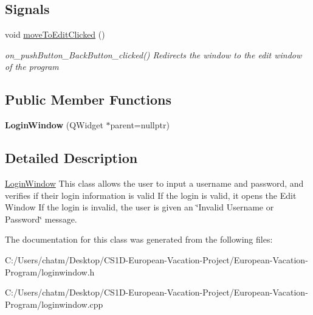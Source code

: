 \subsection*{Signals}
\begin{DoxyCompactItemize}
\item 
\mbox{\label{class_login_window_a0ed797ae07a4afea038499d6929047a1}} 
void \mbox{\hyperlink{class_login_window_a0ed797ae07a4afea038499d6929047a1}{move\+To\+Edit\+Clicked}} ()
\begin{DoxyCompactList}\small\item\em on\+\_\+push\+Button\+\_\+\+Back\+Button\+\_\+clicked() Redirects the window to the edit window of the program \end{DoxyCompactList}\end{DoxyCompactItemize}
\subsection*{Public Member Functions}
\begin{DoxyCompactItemize}
\item 
\mbox{\label{class_login_window_aa4c04d26b299de00156bbf3c32b2a082}} 
{\bfseries Login\+Window} (Q\+Widget $\ast$parent=nullptr)
\end{DoxyCompactItemize}


\subsection{Detailed Description}
\mbox{\hyperlink{class_login_window}{Login\+Window}} This class allows the user to input a username and password, and verifies if their login information is valid If the login is valid, it opens the Edit Window If the login is invalid, the user is given an \char`\"{}\+Invalid Username or Password\char`\"{} message. 

The documentation for this class was generated from the following files\+:\begin{DoxyCompactItemize}
\item 
C\+:/\+Users/chatm/\+Desktop/\+C\+S1\+D-\/\+European-\/\+Vacation-\/\+Project/\+European-\/\+Vacation-\/\+Program/loginwindow.\+h\item 
C\+:/\+Users/chatm/\+Desktop/\+C\+S1\+D-\/\+European-\/\+Vacation-\/\+Project/\+European-\/\+Vacation-\/\+Program/loginwindow.\+cpp\end{DoxyCompactItemize}

